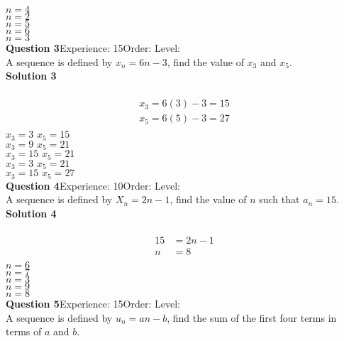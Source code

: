 \documentclass{article}
\begin{document}
$n=4$\\
$n=2$\\
$n=5$\\
$n=6$\\
$n=3$\\
\noindent\textbf{Question 3}\hspace{20pt}Experience: 15\hspace{20pt}Order: \hspace{20pt}Level: \\[2pt]
A sequence is defined by $x_n=6n-3$, find the value of $x_3$ and $x_5$.\\[4pt]
\noindent\textbf{Solution 3}\\[2pt]
\\[-10pt]\begin{align*}
x_3=6(3)-3=15\\[2pt]
x_5=6(5)-3=27\\[2pt]
\end{align*}
$x_3=3 \,\, x_5=15$\\
$x_3=9 \,\, x_5=21$\\
$x_3=15 \,\, x_5=21$\\
$x_3=3 \,\, x_5=21$\\
$x_3=15 \,\, x_5=27$\\
\noindent\textbf{Question 4}\hspace{20pt}Experience: 10\hspace{20pt}Order: \hspace{20pt}Level: \\[2pt]
A sequence is defined by $X_n=2n-1$, find the value of $n$ such that $a_n=15$.\\[4pt]
\noindent\textbf{Solution 4}\\[2pt]
\\[-10pt]\begin{align*}
15&=2n-1\\[2pt]
n&=8\\[10pt]
\end{align*}
$n=6$\\
$n=7$\\
$n=3$\\
$n=9$\\
$n=8$\\
\noindent\textbf{Question 5}\hspace{20pt}Experience: 15\hspace{20pt}Order: \hspace{20pt}Level: \\[2pt]
A sequence is defined by $u_n=an-b$, find the sum of the first four terms in terms of $a$ and $b$.\\[4pt]
\end{document}
